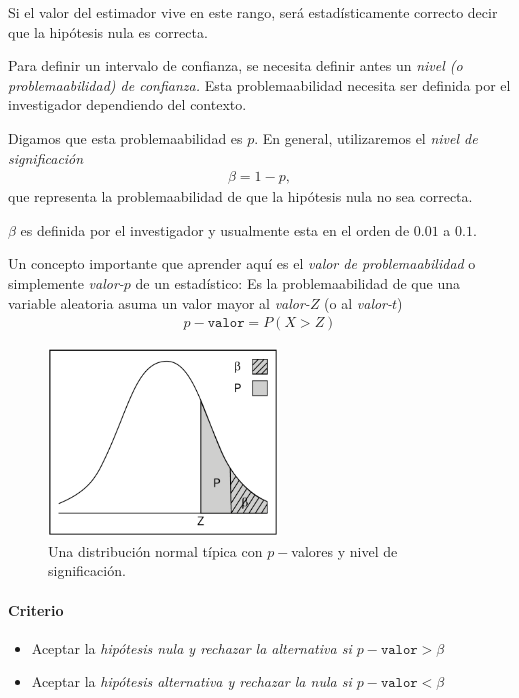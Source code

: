 Si el valor del estimador vive en este rango, será estadísticamente correcto decir que la hipótesis nula es correcta.


Para definir un intervalo de confianza, se necesita definir antes un \emph{nivel (o problemaabilidad) de confianza.}  Esta problemaabilidad necesita ser definida por el investigador dependiendo del contexto.


Digamos que esta problemaabilidad es $p$. En general, utilizaremos el \emph{nivel de significación}
\begin{align}
	\beta = 1-p,
\end{align}
que representa la problemaabilidad de que la hipótesis nula no sea correcta. 

$\beta$ es definida por el investigador y usualmente esta en el orden de $0.01$ a $0.1$.



Un concepto importante que aprender aquí es el \emph{valor de problemaabilidad} o simplemente \emph{valor-}$p$ de un estadístico:  Es la problemaabilidad de que una variable aleatoria asuma un valor mayor al \emph{valor-}$Z$ (o al \emph{valor-}$t$)
\begin{align}
	p-\texttt{valor}=P\left( X>Z \right)
\end{align}



\begin{figure}
	\centering
	\includegraphics[height=5cm,keepaspectratio=true]{./images/kum0402.png}
	\caption{Una distribución normal típica con $p-$valores y nivel de significación.}
	\label{fig:0402}
\end{figure}


\paragraph{Criterio}
\begin{itemize}
	\item Aceptar la \emph{hipótesis nula y rechazar la alternativa si $p-\texttt{valor}>\beta$}
	\item Aceptar la \emph{hipótesis alternativa y rechazar la nula si $p-\texttt{valor}<\beta$}
\end{itemize}



